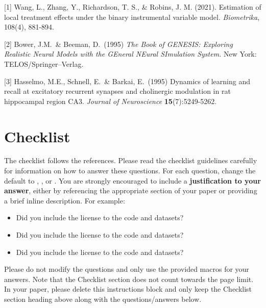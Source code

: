 \documentclass{article}
\begin{document}
{
\small

[1] Wang, L., Zhang, Y., Richardson, T. S., \& Robins, J. M. (2021). Estimation of local treatment effects under the binary instrumental variable model. {\it Biometrika}, 108(4), 881-894.

[2] Bower, J.M.\ \& Beeman, D.\ (1995) {\it The Book of GENESIS: Exploring
  Realistic Neural Models with the GEneral NEural SImulation System.}  New York:
TELOS/Springer--Verlag.


[3] Hasselmo, M.E., Schnell, E.\ \& Barkai, E.\ (1995) Dynamics of learning and
recall at excitatory recurrent synapses and cholinergic modulation in rat
hippocampal region CA3. {\it Journal of Neuroscience} {\bf 15}(7):5249-5262.
}


\section*{Checklist}


The checklist follows the references.  Please
read the checklist guidelines carefully for information on how to answer these
questions.  For each question, change the default \answerTODO{} to \answerYes{},
\answerNo{}, or \answerNA{}.  You are strongly encouraged to include a {\bf
justification to your answer}, either by referencing the appropriate section of
your paper or providing a brief inline description.  For example:
\begin{itemize}
  \item Did you include the license to the code and datasets? 
  \item Did you include the license to the code and datasets? 
  \item Did you include the license to the code and datasets? \answerNA{}
\end{itemize}
Please do not modify the questions and only use the provided macros for your
answers.  Note that the Checklist section does not count towards the page
limit.  In your paper, please delete this instructions block and only keep the
Checklist section heading above along with the questions/answers below.
\end{document}
